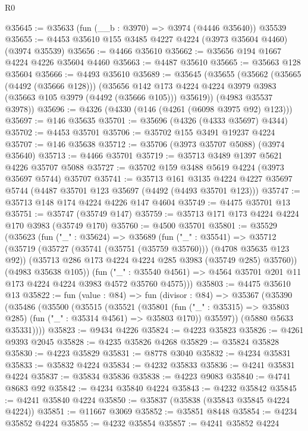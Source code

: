 \begin{lexlean}{R0}
\begin{coremodule}
@35645 := @35633 (fun (__b : @3970) => @3974 (@4446 @35640)) @35539
@35655 := @4453 @35610 @155 @3485 @4227 @4224 (@3973 @35604 @4460) (@3974 @35539)
@35656 := @4466 @35610
@35662 := @35656 @194 @1667 @4224 @4226 @35604 @4460
@35663 := @4487 @35610
@35665 := @35663 @128 @35604
@35666 := @4493 @35610
@35689 := @35645
    (@35655
      (@35662
        (@35665 (@4492 (@35666 @128)))
        (@35656 @142 @173 @4224 @4224 @3979 @3983 (@35663 @105 @3979 (@4492 (@35666 @105))) @35619))
      (@4983 @35537 @3978))
@35696 := @4326 (@4330 (@146 (@4261 (@6098 @3975 @92) @123)))
@35697 := @146 @35635
@35701 := @35696 (@4326 (@4333 @35697) @4344)
@35702 := @4453 @35701
@35706 := @35702 @155 @3491 @19237 @4224
@35707 := @146 @35638
@35712 := @35706 (@3973 @35707 @5088) (@3974 @35640)
@35713 := @4466 @35701
@35719 := @35713 @3489 @1397 @5621 @4226 @35707 @5088
@35727 := @35702 @159 @3488 @5619 @4224 (@3973 @35697 @5744) @35707
@35741 := @35713
    @161
    @3135
    @4224
    @4227
    @35697
    @5744
    (@4487 @35701 @123 @35697 (@4492 (@4493 @35701 @123)))
@35747 := @35713 @148 @174 @4224 @4226 @147 @4604
@35749 := @4475 @35701 @13
@35751 := @35747 (@35749 @147)
@35759 := @35713 @171 @173 @4224 @4224 @170 @3983 (@35749 @170)
@35760 := @4500 @35701
@35801 := @35529
    (@35623
      (fun ("_" : @35624) =>
      @35689
        (fun ("_" : @35541) =>
        @35712
          (@35719
            (@35727 (@35741 (@35751 (@35759 @35760))) (@4708 @35635 @123 @92))
            (@35713 @286 @173 @4224 @4224 @285 @3983 (@35749 @285) @35760))
          (@4983 @35638 @105))
        (fun ("_" : @35540 @4561) =>
        @4564 @35701 @201 @11 @173 @4224 @4224 @3983 @4572 @35760 @4575)))
@35803 := @4475 @35610 @13
@35822 := fun (value : @84) =>
  fun (divisor : @84) =>
  @35367
    (@35390
      (@35486
        (@35500
          (@35515
            (@35521
              (@35801 (fun ("_" : @35315) => @35803 @285) (fun ("_" : @35314 @4561) => @35803 @170))
              @35597))
          (@5880 @5633 @35331))))
@35823 := @9434 @4226
@35824 := @4223 @35823
@35826 := @4261 @9393 @2045
@35828 := @4235 @35826 @4268
@35829 := @35824 @35828
@35830 := @4223 @35829
@35831 := @8778 @3040
@35832 := @4234 @35831
@35833 := @35832 @4224
@35834 := @4232 @35833
@35836 := @4241 @35831 @4224
@35837 := @35834 @35836
@35838 := @4223 @9083
@35840 := @4741 @8683 @92
@35842 := @4234 @35840 @4224
@35843 := @4232 @35842
@35845 := @4241 @35840 @4224
@35850 := @35837 (@35838 (@35843 @35845 @4224 @4224))
@35851 := @11667 @3069
@35852 := @35851 @8448
@35854 := @4234 @35852 @4224
@35855 := @4232 @35854
@35857 := @4241 @35852 @4224

\end{coremodule}
\end{lexlean}
